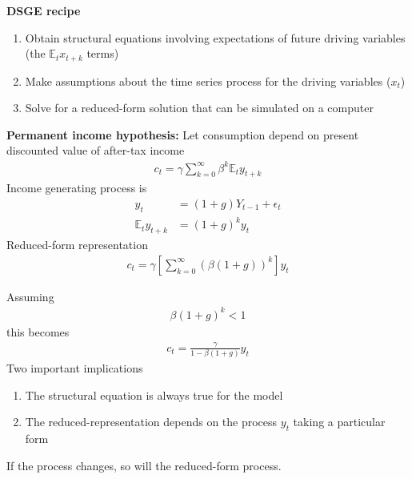 \documentclass{beamer}
\begin{document}
\begin{frame}
  \textbf{DSGE recipe}
  \begin{enumerate}
  \item Obtain structural equations involving expectations of future driving variables (the $\mathbb{E}_tx_{t+k}$ terms)
  \item Make assumptions about the time series process for the driving variables ($x_t$)
  \item Solve for a reduced-form solution that can be simulated on a computer
\end{enumerate}
\end{frame}

\begin{frame}
  \textbf{Permanent income hypothesis:} Let consumption depend on present discounted value of after-tax income
\begin{align}
  c_t=\gamma \sum^{\infty}_{k=0}\beta^k \mathbb{E}_ty_{t+k}
\end{align}
 Income generating process is 
 \begin{align}
   y_t&= (1+g)Y_{t-1}+\epsilon_t \\
   \mathbb{E}_ty_{t+k}&=(1+g)^ky_t
 \end{align}
 Reduced-form representation
 \begin{align}
    c_t=\gamma \left[\sum^{\infty}_{k=0} (\beta(1+g))^k \right ]y_t
  \end{align}
\end{frame}

\begin{frame}
  Assuming 
  \begin{align}
    \beta(1+g)^k<1
  \end{align}
  this becomes
\begin{align}
  c_t=\frac{\gamma}{1-\beta(1+g)}y_t
\end{align}
Two important implications
  \begin{enumerate}
  \item The structural equation is always true for the model
  \item The reduced-representation depends on the process $y_t$ taking a particular form
\end{enumerate}
If the process changes, so will the reduced-form process. 
\end{frame}
\end{document}
